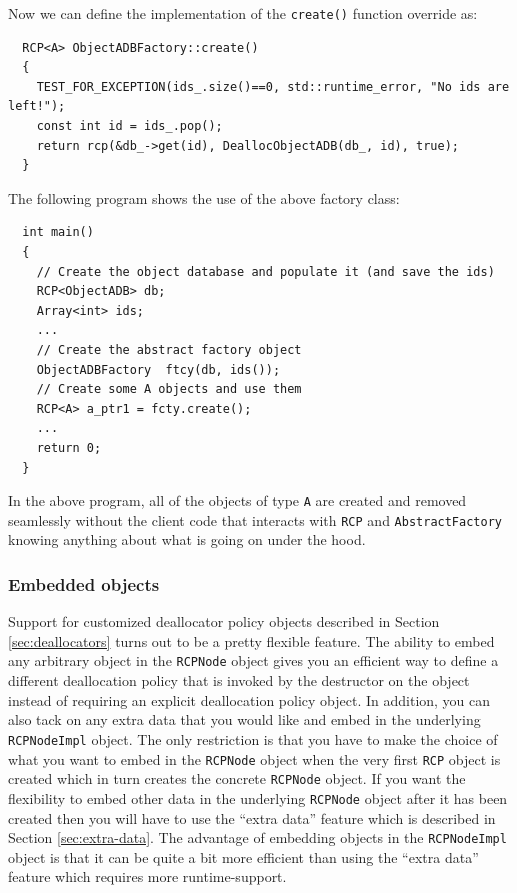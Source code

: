 \documentclass[pdf,ps2pdf,11pt]{SANDreport}
\begin{document}
Now we can define the implementation of the {}\texttt{create()}
function override as:

{\small\begin{verbatim}
  RCP<A> ObjectADBFactory::create()
  {
    TEST_FOR_EXCEPTION(ids_.size()==0, std::runtime_error, "No ids are left!");
    const int id = ids_.pop();
    return rcp(&db_->get(id), DeallocObjectADB(db_, id), true);
  }
\end{verbatim}}

The following program shows the use of the above factory class:

{\small\begin{verbatim}
  int main()
  {
    // Create the object database and populate it (and save the ids)
    RCP<ObjectADB> db;
    Array<int> ids;
    ...
    // Create the abstract factory object
    ObjectADBFactory  ftcy(db, ids());
    // Create some A objects and use them
    RCP<A> a_ptr1 = fcty.create();
    ...
    return 0;
  }
\end{verbatim}}

In the above program, all of the objects of type {}\texttt{A} are
created and removed seamlessly without the client code that interacts
with {}\texttt{RCP} and {}\texttt{AbstractFactory} knowing anything
about what is going on under the hood.


%
{}\subsubsection{Embedded objects}
\label{sec:embedded-objecs}
%

Support for customized deallocator policy objects described in Section
{}\ref{sec:deallocators} turns out to be a pretty flexible feature.
The ability to embed any arbitrary object in the {}\texttt{RCPNode}
object gives you an efficient way to define a different deallocation
policy that is invoked by the destructor on the object instead of
requiring an explicit deallocation policy object.  In addition, you
can also tack on any extra data that you would like and embed in the
underlying {}\texttt{RCPNodeImpl} object.  The only restriction is
that you have to make the choice of what you want to embed in the
{}\texttt{RCPNode} object when the very first {}\texttt{RCP} object is
created which in turn creates the concrete {}\texttt{RCPNode} object.
If you want the flexibility to embed other data in the underlying
{}\texttt{RCPNode} object after it has been created then you will have
to use the ``extra data'' feature which is described in Section
{}\ref{sec:extra-data}.  The advantage of embedding objects in the
{}\texttt{RCPNodeImpl} object is that it can be quite a bit more
efficient than using the ``extra data'' feature which requires more
runtime-support.
\end{document}
